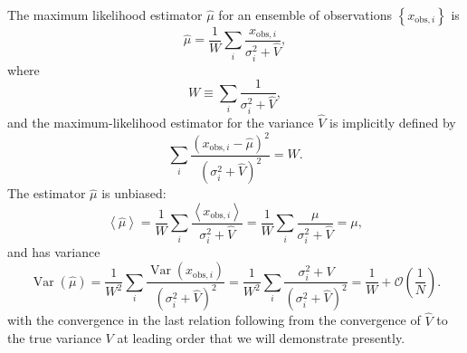 \documentclass[modern]{aastex631}
\DeclareMathOperator{\Var}{Var}
\begin{document}
The maximum likelihood estimator $\hat{\mu}$ for an ensemble of observations
$\left\{ x_{\mathrm{obs},i} \right\}$ is 
\begin{equation}
    \label{eq:mu-hat}
    \hat{\mu} = \frac{1}{W} \sum_i \frac{x_{\mathrm{obs},i}}{\sigma_i^2 + \hat{V}}, 
\end{equation}
where 
\begin{equation}
    W \equiv \sum_i \frac{1}{\sigma_i^2 + \hat{V}},
\end{equation}
and the maximum-likelihood estimator for the variance $\hat{V}$ is implicitly
defined by 
\begin{equation}
    \label{eq:V-hat}
    \sum_i \frac{\left( x_{\mathrm{obs},i} - \hat{\mu} \right)^2}{\left( \sigma_i^2 + \hat{V} \right)^2} = W.
\end{equation}
The estimator $\hat{\mu}$ is unbiased:
\begin{equation}
    \left\langle \hat{\mu} \right\rangle = \frac{1}{W} \sum_i \frac{\left\langle x_{\mathrm{obs},i} \right\rangle}{\sigma_i^2 + \hat{V}} = \frac{1}{W} \sum_i \frac{\mu}{\sigma_i^2 + \hat{V}} = \mu,
\end{equation}
and has variance 
\begin{equation}
    \Var\left( \hat{\mu} \right) = \frac{1}{W^2} \sum_i \frac{\Var\left( x_{\mathrm{obs},i} \right)}{\left( \sigma_i^2 + \hat{V} \right)^2} = \frac{1}{W^2} \sum_i \frac{\sigma_i^2 + V}{\left(\sigma_i^2 + \hat{V}\right)^2} = \frac{1}{W} + \mathcal{O}\left( \frac{1}{N} \right).
\end{equation}
with the convergence in the last relation following from the convergence of
$\hat{V}$ to the true variance $V$ at leading order that we will demonstrate
presently. 
\end{document}
